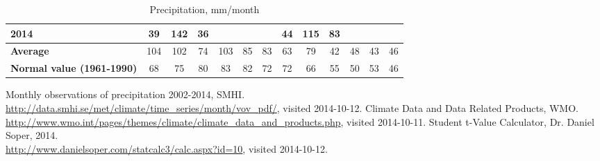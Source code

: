 \documentclass[a4paper,9pt,fleqn]{article}
\begin{document}
\begin{table}
\begin{tabularx}{14cm}{X|cccccc|cccccc}
{\bf 2014}    & 39        & 142       & 36        &           &           &           & 44        & 115       & 83        &           &           &           \\ \hline
{\bf Average} & 104       & 102       & 74        & 103       & 85        & 83        & 63        & 79        & 42        & 48        & 43        & 46        \\ \hline
{\bf Normal value \newline
(1961-1990)}  & 68        & 75        & 80       & 83         & 82        & 72        & 72        & 66        & 55        & 50        & 53        & 46        \\
\end{tabularx}
\caption{Precipitation, mm/month}
\label{tab:gbg/sthlm}
\end{table}


\begin{thebibliography}{3}
     Monthly observations of precipitation 2002-2014, SMHI.                                \\
                   \url{http://data.smhi.se/met/climate/time_series/month/vov_pdf/}, \mbox{visited} 2014-10-12.
      Climate Data and Data Related Products, WMO.                                                     \\
                   \url{http://www.wmo.int/pages/themes/climate/climate_data_and_products.php}, \mbox{visited} 2014-10-11.
 Student t-Value Calculator, Dr. Daniel Soper, 2014.                                      \\
                   \url{http://www.danielsoper.com/statcalc3/calc.aspx?id=10},
                   \mbox{visited} 2014-10-12.
\end{thebibliography}
\end{document}
